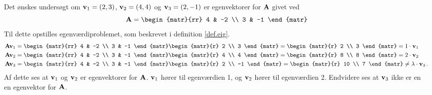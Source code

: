 \begin{example}
Det ønskes undersøgt om $ \mathbf{v}_1 = (2,3) $, $ \mathbf{v}_2 = (4,4) $ og $ \mathbf{v}_3 = (2,-1) $ er egenvektorer for $ \mathbf{A} $ givet ved
\begin{equation}
\mA = \begin{matr}{rr} 4 & -2 \\ 3 & -1 \end{matr}
\end{equation}
Til dette opstilles egenværdiproblemet, som beskrevet i definition \ref{def.eig}.
\begin{equation}
\begin{aligned}
\mA\mv_1 &= \begin{matr}{rr} 4 & -2 \\ 3 & -1 \end{matr} \begin{matr}{r} 2 \\ 3 \end{matr} = \begin{matr}{r} 2 \\ 3 \end{matr} = 1 \cdot \mv_1 \\
\mA\mv_2 &= \begin{matr}{rr} 4 & -2 \\ 3 & -1 \end{matr} \begin{matr}{r} 4 \\ 4 \end{matr} = \begin{matr}{r} 8 \\ 8 \end{matr} = 2 \cdot \mv_2 \\
\mA\mv_3 &= \begin{matr}{rr} 4 & -2 \\ 3 & -1 \end{matr} \begin{matr}{r} 2 \\ -1 \end{matr} = \begin{matr}{r} 10 \\ 7 \end{matr} \neq \lambda \cdot \mv_3 \,.
\end{aligned}
\end{equation}
Af dette ses at $ \mathbf{v}_1 $ og $ \mathbf{v}_2 $ er egenvektorer for $ \mathbf{A} $. $ \mathbf{v}_1 $ hører til egenværdien 1, og $ \mathbf{v}_2 $ hører til egenværdien 2. \bs
Endvidere ses at $ \mathbf{v}_3 $ ikke er en en egenvektor for $ \mathbf{A} $.
\end{example}


